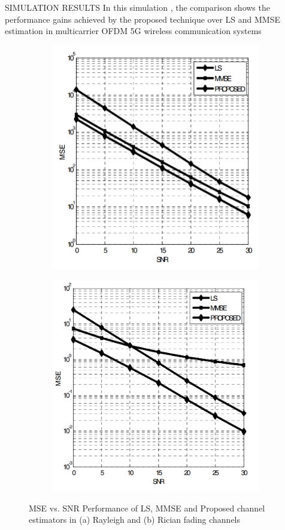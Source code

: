 \documentclass{beamer}
\begin{document}
\begin{frame}{SIMULATION RESULTS}
 In this simulation , the comparison shows the performance gains achieved by the proposed technique over LS and MMSE estimation in 
multicarrier OFDM 5G wireless communication systems
\begin{figure}
\begin{subfigure}{.5\textwidth}
  \centering
  \includegraphics[width=.8\linewidth]{images/Rayleigh.png}
  \caption{}
  \label{fig:Rayleigh}
\end{subfigure}%
\begin{subfigure}{.5\textwidth}
  \centering
  \includegraphics[width=.8\linewidth]{images/Rician.png}
  \caption{}
  \label{fig:Rician}
\end{subfigure}
\caption{{\tiny MSE vs. SNR Performance of LS, MMSE and Proposed channel estimators in (a) Rayleigh and (b) Rician fading channels}}
\label{fig:fig}
\end{figure}
\end{frame}
\end{document}
